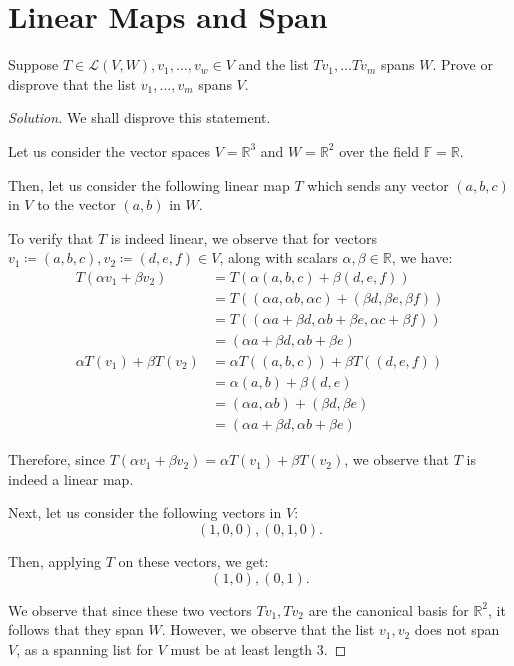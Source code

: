 \documentclass{article}
\newenvironment{solution}{\begin{proof}[Solution]}{\end{proof}}
\newcommand{\RR}{\mathbb{R}}
\begin{document}
	\section{Linear Maps and Span}
	\begin{hw}
		Suppose $T \in \mathcal{L} (V,W), v_{1}, \ldots, v_{w} \in V$ and the list $Tv_{1}, \ldots Tv_{m}$ spans $W$. Prove or disprove that the list $v_{1}, \ldots, v_{m}$ spans $V$.
	\end{hw}
	\begin{solution}
		We shall disprove this statement.
		
		Let us consider the vector spaces $V = \RR^{3}$ and $W = \RR^{2}$ over the field $\mathbb{F} = \RR$.
		 
		Then, let us consider the following linear map $T$ which sends any vector $(a,b,c)$ in $V$ to the vector $(a,b)$ in $W$.
		
		To verify that $T$ is indeed linear, we observe that for vectors $v_{1} \coloneq (a,b,c), v_{2} \coloneq (d,e,f) \in V$, along with scalars $\alpha, \beta \in \RR$, we have:
		\begin{align*}
			T(\alpha v_{1} + \beta v_{2}) &= T(\alpha (a,b,c) + \beta (d,e,f)) \\
			&= T( (\alpha a, \alpha b, \alpha c) + (\beta d, \beta e, \beta f)) \\
			&= T( (\alpha a + \beta d, \alpha b + \beta e, \alpha c + \beta f)) \\
			&= (\alpha a + \beta d, \alpha b + \beta e)
			\\
			\alpha T(v_{1}) + \beta T(v_{2}) &= \alpha T( (a,b,c)) + \beta T( (d,e,f)) \\
			&= \alpha (a,b) + \beta(d,e) \\
			&= (\alpha a, \alpha b) + (\beta d , \beta e) \\
			&= (\alpha a + \beta d, \alpha b + \beta e)
		\end{align*}
	
		Therefore, since $T(\alpha v_{1} + \beta v_{2}) = \alpha T(v_{1}) + \beta T(v_{2})$, we observe that $T$ is indeed a linear map.
				
		Next, let us consider the following vectors in $V$:
		\begin{equation*}
			(1,0,0), (0,1,0).
		\end{equation*}
	
		Then, applying $T$ on these vectors, we get:
		\begin{equation*}
			(1,0), (0,1).
		\end{equation*}
	
		We observe that since these two vectors $Tv_{1}, Tv_{2}$ are the canonical basis for $\RR^{2}$, it follows that they span $W$. However, we observe that the list $v_{1}, v_{2}$ does not span $V$, as a spanning list for $V$ must be at least length 3.
	\end{solution}
\end{document}
